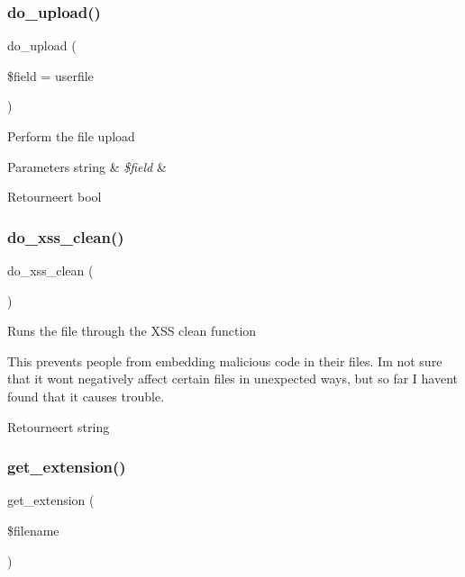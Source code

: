 \subsubsection{\texorpdfstring{do\_upload()}{do\_upload()}}
{\footnotesize\ttfamily do\+\_\+upload (\begin{DoxyParamCaption}\item[{}]{\$field = {\ttfamily \textquotesingle{}userfile\textquotesingle{}} }\end{DoxyParamCaption})}

Perform the file upload


\begin{DoxyParams}[1]{Parameters}
string & {\em \$field} & \\
\hline
\end{DoxyParams}
\begin{DoxyReturn}{Retourneert}
bool 
\end{DoxyReturn}
\mbox{\label{class_c_i___upload_ae7e5f9b6d774795da126647f10c3c2a6}} 
\subsubsection{\texorpdfstring{do\_xss\_clean()}{do\_xss\_clean()}}
{\footnotesize\ttfamily do\+\_\+xss\+\_\+clean (\begin{DoxyParamCaption}{ }\end{DoxyParamCaption})}

Runs the file through the X\+SS clean function

This prevents people from embedding malicious code in their files. I\textquotesingle{}m not sure that it won\textquotesingle{}t negatively affect certain files in unexpected ways, but so far I haven\textquotesingle{}t found that it causes trouble.

\begin{DoxyReturn}{Retourneert}
string 
\end{DoxyReturn}
\mbox{\label{class_c_i___upload_a6c656eedccb1131accc8e350bc50632f}} 
\subsubsection{\texorpdfstring{get\_extension()}{get\_extension()}}
{\footnotesize\ttfamily get\+\_\+extension (\begin{DoxyParamCaption}\item[{}]{\$filename }\end{DoxyParamCaption})}

